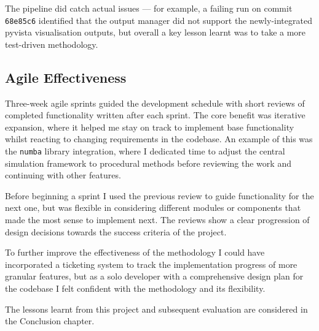 The pipeline did catch actual issues --- for example, a failing run on commit \texttt{68e85c6} identified that the output manager did not support the newly-integrated pyvista visualisation outputs, but overall a key lesson learnt was to take a more test-driven methodology.


\subsection{Agile Effectiveness}
\label{sec:4.5.2}

Three-week agile sprints guided the development schedule with short reviews of completed functionality written after each sprint. The core benefit was iterative expansion, where it helped me stay on track to implement base functionality whilst reacting to changing requirements in the codebase. An example of this was the \texttt{numba} library integration, where I dedicated time to adjust the central simulation framework to procedural methods before reviewing the work and continuing with other features.

Before beginning a sprint I used the previous review to guide functionality for the next one, but was flexible in considering different modules or components that made the most sense to implement next. The reviews show a clear progression of design decisions towards the success criteria of the project.

To further improve the effectiveness of the methodology I could have incorporated a ticketing system to track the implementation progress of more granular features, but as a solo developer with a comprehensive design plan for the codebase I felt confident with the methodology and its flexibility.

\vspace{3em}

The lessons learnt from this project and subsequent evaluation are considered in the Conclusion chapter.